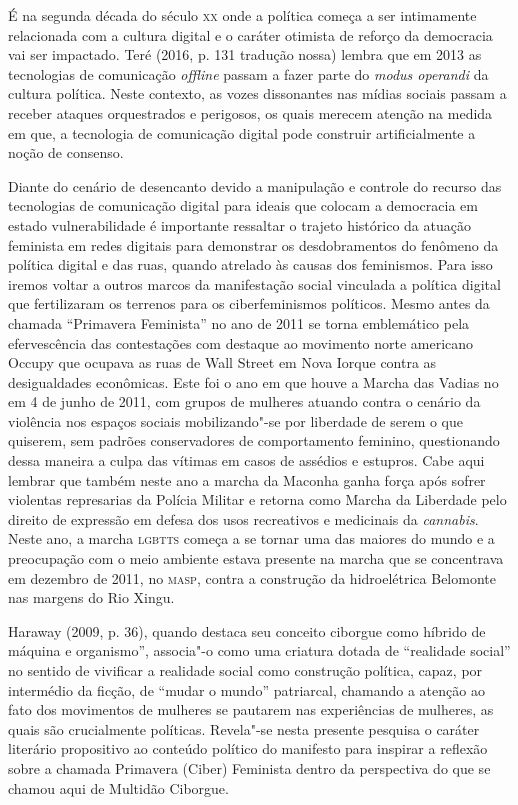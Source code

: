 É na segunda década do século \textsc{xx} onde a política começa a ser
intimamente relacionada com a cultura digital e o caráter otimista de
reforço da democracia vai ser impactado. Teré (2016, p. 131 tradução
nossa) lembra que em 2013 as tecnologias de comunicação \emph{offline} passam a
fazer parte do \emph{modus operandi} da cultura política. Neste
contexto, as vozes dissonantes nas mídias sociais passam a receber
ataques orquestrados e perigosos, os quais merecem atenção na medida em
que, a tecnologia de comunicação digital pode construir artificialmente
a noção de consenso.

Diante do cenário de desencanto devido a manipulação e controle do
recurso das tecnologias de comunicação digital para ideais que colocam a
democracia em estado vulnerabilidade é importante ressaltar o trajeto
histórico da atuação feminista em redes digitais para demonstrar os
desdobramentos do fenômeno da política digital e das ruas, quando
atrelado às causas dos feminismos. Para isso iremos voltar a outros
marcos da manifestação social vinculada a política digital que
fertilizaram os terrenos para os ciberfeminismos políticos. Mesmo antes
da chamada ``Primavera Feminista'' no ano de 2011 se torna emblemático
pela efervescência das contestações com destaque ao movimento norte
americano Occupy que ocupava as ruas de Wall Street em Nova Iorque
contra as desigualdades econômicas. Este foi o ano em que houve a Marcha
das Vadias no em 4 de junho de 2011, com grupos de mulheres atuando
contra o cenário da violência nos espaços sociais mobilizando"-se por
liberdade de serem o que quiserem, sem padrões conservadores de
comportamento feminino, questionando dessa maneira a culpa das vítimas
em casos de assédios e estupros. Cabe aqui lembrar que também neste ano
a marcha da Maconha ganha força após sofrer violentas represarias da
Polícia Militar e retorna como Marcha da Liberdade pelo direito de
expressão em defesa dos usos recreativos e medicinais da
\emph{cannabis}. Neste ano, a marcha \textsc{lgbtts} começa a se tornar uma das
maiores do mundo e a preocupação com o meio ambiente estava presente na
marcha que se concentrava em dezembro de 2011, no \textsc{masp}, contra a
construção da hidroelétrica Belomonte nas margens do Rio Xingu.

Haraway (2009, p. 36), quando destaca seu conceito ciborgue como híbrido
de máquina e organismo'', associa"-o como uma criatura dotada de
``realidade social'' no sentido de vivificar a realidade social como
construção política, capaz, por intermédio da ficção, de ``mudar o
mundo'' patriarcal, chamando a atenção ao fato dos movimentos de
mulheres se pautarem nas experiências de mulheres, as quais são
crucialmente políticas. Revela"-se nesta presente pesquisa o caráter
literário propositivo ao conteúdo político do manifesto para inspirar a
reflexão sobre a chamada Primavera (Ciber) Feminista dentro da
perspectiva do que se chamou aqui de Multidão Ciborgue.

